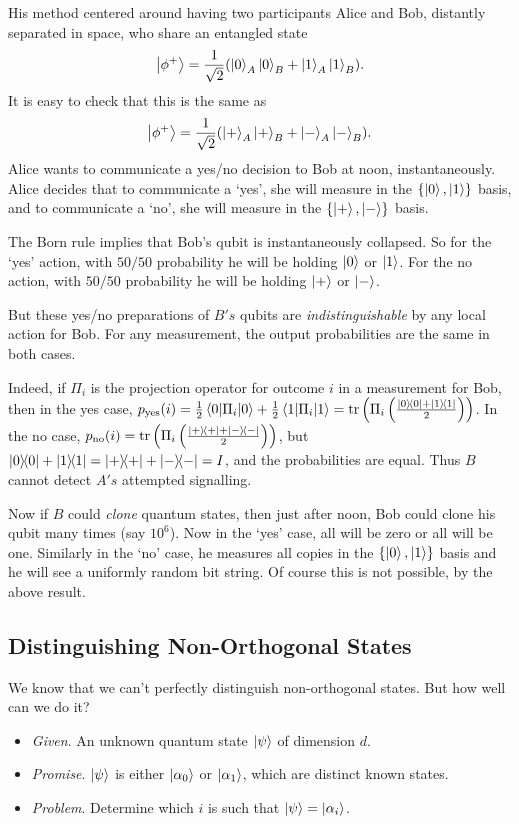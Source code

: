 \documentclass[a4paper]{article}
\begin{document}
	His method centered around having two participants Alice and Bob, distantly separated in space, who share an entangled state
	$$
	\ket{\phi^+} = \frac{1}{\sqrt{2}}(\ket{0}_A \ket{0}_B + \ket{1}_A \ket{1}_B).
	$$
	It is easy to check that this is the same as
	$$
	\ket{\phi^+} = \frac{1}{\sqrt{2}}(\ket{+}_A \ket{+}_B + \ket{-}_A \ket{-}_B).
	$$
	Alice wants to communicate a yes/no decision to Bob at noon, instantaneously. Alice decides that to communicate a `yes', she will measure in the $\{\ket{0}, \ket{1}\}$ basis, and to communicate a `no', she will measure in the $\{\ket{+}, \ket{-}\}$ basis. 

The Born rule implies that Bob's qubit is instantaneously collapsed. So for the `yes' action, with $50/50$ probability he will be holding $\ket{0}$ or $\ket{1}$. For the no action, with $50/50$ probability he will be holding $\ket{+}$ or $\ket{-}$.

But these yes/no preparations of $B's$ qubits are \emph{indistinguishable} by any local action for Bob. 
For any measurement, the output probabilities are the same in both cases.

Indeed, if $\Pi_i$ is the projection operator for outcome $i$ in a measurement for Bob, then in the yes case, $p_{\text{yes}}(i) = \frac{1}{2}\ev{\Pi_i}{0}  +\frac{1}{2}\ev{\Pi_i}{1} = \tr\left(\Pi_i \left(\frac{\op{0}{0} + \op{1}{1}}{2}\right)\right)$. In the no case, $p_{\text{no}}(i) = \tr\left(\Pi_i \left(\frac{\op{+}{+} + \op{-}{-}}{2}\right)\right)$, but $\op{0}{0} + \op{1}{1} = \op{+}{+} + \op{-}{-} = I$, and the probabilities are equal. Thus $B$ cannot detect $A's$ attempted signalling.

Now if $B$ could \emph{clone} quantum states, then just after noon, Bob could clone his qubit many times (say $10^6$). Now in the `yes' case, all will be zero or all will be one. Similarly in the `no' case, he measures all copies in the $\{\ket{0}, \ket{1}\}$ basis and he will see a uniformly random bit string. Of course this is not possible, by the above result.

\subsection{Distinguishing Non-Orthogonal States}

We know that we can't perfectly distinguish non-orthogonal states. But how well can we do it?

\begin{itemize}
	\item \emph{Given}. An unknown quantum state $\ket{\psi}$ of dimension $d$.
	\item \emph{Promise}. $\ket{\psi}$ is either $\ket{\alpha_0}$ or $\ket{\alpha_1}$, which are distinct known states.
	\item \emph{Problem}. Determine which $i$ is such that $\ket{\psi} = \ket{\alpha_i}$.
\end{itemize}
\end{document}
